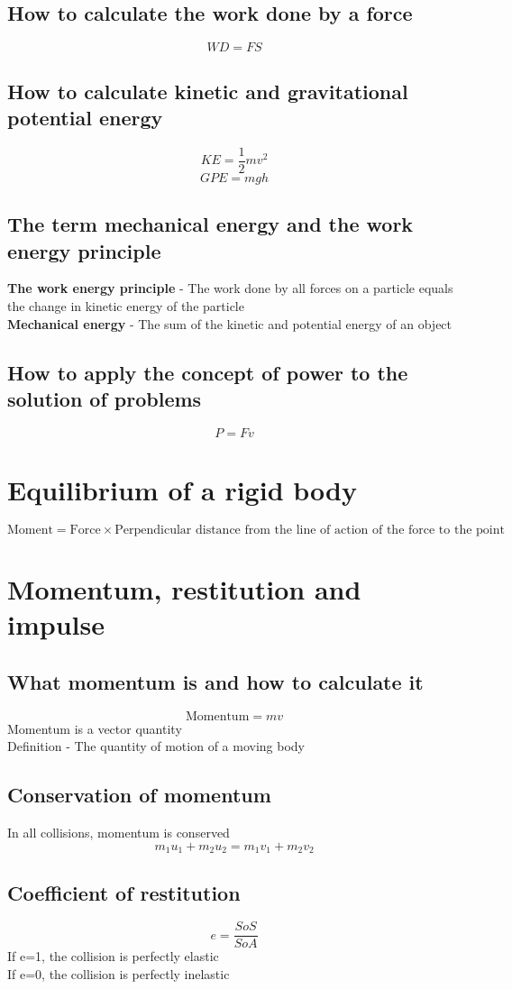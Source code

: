 \documentclass{article}[18pt]
\begin{document}
\subsection{How to calculate the work done by a force}
$$WD=FS$$
\subsection{How to calculate kinetic and gravitational potential energy}
$$KE=\frac{1}{2}mv^2$$
$$GPE=mgh$$
\subsection{The term mechanical energy and the work energy principle}
\textbf{The work energy principle} - The work done by all forces on a particle equals the change in kinetic energy of the particle\\
\textbf{Mechanical energy} - The sum of the kinetic and potential energy of an object
\subsection{How to apply the concept of power to the solution of problems}
$$P=Fv$$
\newpage
\section{Equilibrium of a rigid body}
$$\textrm{Moment}=\textrm{Force}\times\textrm{Perpendicular distance from the line of action of the force to the point}$$
\section{Momentum, restitution and impulse}
\subsection{What momentum is and how to calculate it}
$$\textrm{Momentum}=mv$$
Momentum is a vector quantity\\
Definition - The quantity of motion of a moving body
\subsection{Conservation of momentum}
In all collisions, momentum is conserved
$$m_1u_1+m_2u_2=m_1v_1+m_2v_2$$
\subsection{Coefficient of restitution}
$$e=\frac{SoS}{SoA}$$
If e=1, the collision is perfectly elastic\\
If e=0, the collision is perfectly inelastic
\end{document}
